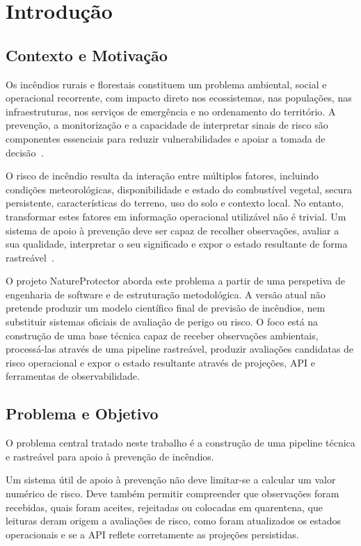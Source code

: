 \chapter{Introdução}

\section{Contexto e Motivação}

Os incêndios rurais e florestais constituem um problema ambiental, social e operacional recorrente, com impacto direto nos ecossistemas, nas populações, nas infraestruturas, nos serviços de emergência e no ordenamento do território. A prevenção, a monitorização e a capacidade de interpretar sinais de risco são componentes essenciais para reduzir vulnerabilidades e apoiar a tomada de decisão~\citep{icnf_incendios_rurais,copernicus_effis}.

O risco de incêndio resulta da interação entre múltiplos fatores, incluindo condições meteorológicas, disponibilidade e estado do combustível vegetal, secura persistente, características do terreno, uso do solo e contexto local. No entanto, transformar estes fatores em informação operacional utilizável não é trivial. Um sistema de apoio à prevenção deve ser capaz de recolher observações, avaliar a sua qualidade, interpretar o seu significado e expor o estado resultante de forma rastreável~\citep{nrcan_fwi_system,keetch_byram_1968,clms_corine_land_cover}.

O projeto NatureProtector aborda este problema a partir de uma perspetiva de engenharia de software e de estruturação metodológica. A versão atual não pretende produzir um modelo científico final de previsão de incêndios, nem substituir sistemas oficiais de avaliação de perigo ou risco. O foco está na construção de uma base técnica capaz de receber observações ambientais, processá-las através de uma pipeline rastreável, produzir avaliações candidatas de risco operacional e expor o estado resultante através de projeções, API e ferramentas de observabilidade.

\section{Problema e Objetivo}

O problema central tratado neste trabalho é a construção de uma pipeline técnica e rastreável para apoio à prevenção de incêndios.

Um sistema útil de apoio à prevenção não deve limitar-se a calcular um valor numérico de risco. Deve também permitir compreender que observações foram recebidas, quais foram aceites, rejeitadas ou colocadas em quarentena, que leituras deram origem a avaliações de risco, como foram atualizados os estados operacionais e se a API reflete corretamente as projeções persistidas.

